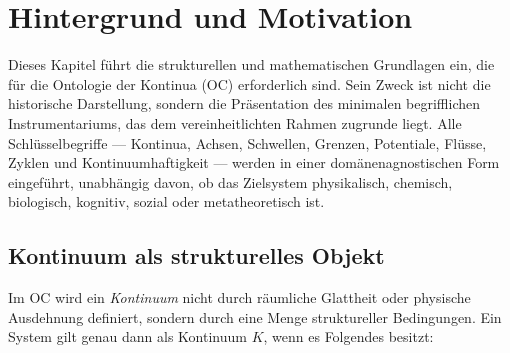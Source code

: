 \section{Hintergrund und Motivation}
\label{sec:background}

Dieses Kapitel führt die strukturellen und mathematischen Grundlagen ein, die für die Ontologie der Kontinua (OC) erforderlich sind.  
Sein Zweck ist nicht die historische Darstellung, sondern die Präsentation des minimalen begrifflichen Instrumentariums, das dem vereinheitlichten Rahmen zugrunde liegt.  
Alle Schlüsselbegriffe --- Kontinua, Achsen, Schwellen, Grenzen, Potentiale, Flüsse, Zyklen und Kontinuumhaftigkeit --- werden in einer domänenagnostischen Form eingeführt, unabhängig davon, ob das Zielsystem physikalisch, chemisch, biologisch, kognitiv, sozial oder metatheoretisch ist.

\subsection{Kontinuum als strukturelles Objekt}

Im OC wird ein \emph{Kontinuum} nicht durch räumliche Glattheit oder physische Ausdehnung definiert, sondern durch eine Menge struktureller Bedingungen.  
Ein System gilt genau dann als Kontinuum \(K\), wenn es Folgendes besitzt:

